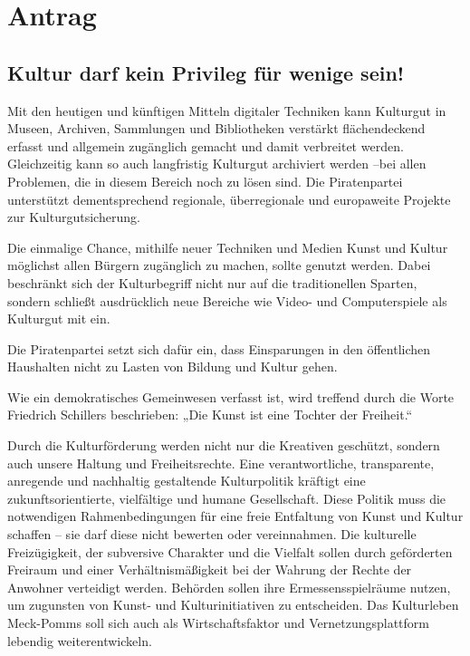 \section{Antrag}

\subsection{Kultur darf kein Privileg für wenige sein!}

Mit den heutigen und künftigen Mitteln digitaler Techniken kann Kulturgut in Museen, Archiven, Sammlungen und Bibliotheken verstärkt flächendeckend erfasst und allgemein zugänglich gemacht und damit verbreitet werden. Gleichzeitig kann so auch langfristig Kulturgut archiviert werden –bei allen Problemen, die in diesem Bereich noch zu lösen sind. Die Piratenpartei unterstützt dementsprechend regionale, überregionale und europaweite Projekte zur Kulturgutsicherung.

Die einmalige Chance, mithilfe neuer Techniken und Medien Kunst und Kultur möglichst allen Bürgern zugänglich zu machen, sollte genutzt werden. Dabei beschränkt sich der Kulturbegriff nicht nur auf die traditionellen Sparten, sondern schließt ausdrücklich neue Bereiche wie Video- und Computerspiele als Kulturgut mit ein.

Die Piratenpartei setzt sich dafür ein, dass Einsparungen in den öffentlichen Haushalten nicht zu Lasten von Bildung und Kultur gehen.

Wie ein demokratisches Gemeinwesen verfasst ist, wird treffend durch die Worte Friedrich Schillers beschrieben: „Die Kunst ist eine Tochter der Freiheit.``

Durch die Kulturförderung werden nicht nur die Kreativen geschützt, sondern auch unsere Haltung und Freiheitsrechte. Eine verantwortliche, transparente, anregende und nachhaltig gestaltende Kulturpolitik kräftigt eine zukunftsorientierte, vielfältige und humane Gesellschaft. Diese Politik muss die notwendigen Rahmenbedingungen für eine freie Entfaltung von Kunst und Kultur schaffen – sie darf diese nicht bewerten oder vereinnahmen. Die kulturelle Freizügigkeit, der subversive Charakter und die Vielfalt sollen durch geförderten Freiraum und einer Verhältnismäßigkeit bei der Wahrung der Rechte der Anwohner verteidigt werden. Behörden sollen ihre Ermessensspielräume nutzen, um zugunsten von Kunst- und Kulturinitiativen zu entscheiden. Das Kulturleben Meck-Pomms soll sich auch als Wirtschaftsfaktor und Vernetzungsplattform lebendig weiterentwickeln.

